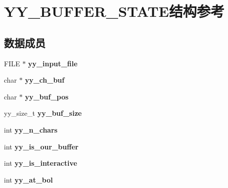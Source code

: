 \hypertarget{structyy__buffer__state}{
\section{YY\_\-BUFFER\_\-STATE结构参考}
\label{structyy__buffer__state}
}
\subsection*{数据成员}
\begin{DoxyCompactItemize}
\item 
\hypertarget{structyy__buffer__state_afb2a40bf9a1b84be81d8e8c0bbcbee21}{
FILE $\ast$ {\bfseries yy\_\-input\_\-file}}
\label{structyy__buffer__state_afb2a40bf9a1b84be81d8e8c0bbcbee21}

\item 
\hypertarget{structyy__buffer__state_af61a9e79f8fc1edb3ae8a2fa2952ce22}{
char $\ast$ {\bfseries yy\_\-ch\_\-buf}}
\label{structyy__buffer__state_af61a9e79f8fc1edb3ae8a2fa2952ce22}

\item 
\hypertarget{structyy__buffer__state_ae8850ab3d90f9339c392020e7d83c4c7}{
char $\ast$ {\bfseries yy\_\-buf\_\-pos}}
\label{structyy__buffer__state_ae8850ab3d90f9339c392020e7d83c4c7}

\item 
\hypertarget{structyy__buffer__state_a98a79041ff2a95eaa8a5c6d1e1562306}{
yy\_\-size\_\-t {\bfseries yy\_\-buf\_\-size}}
\label{structyy__buffer__state_a98a79041ff2a95eaa8a5c6d1e1562306}

\item 
\hypertarget{structyy__buffer__state_aa86c122f2050dbfd365fcf547e6fc1c3}{
int {\bfseries yy\_\-n\_\-chars}}
\label{structyy__buffer__state_aa86c122f2050dbfd365fcf547e6fc1c3}

\item 
\hypertarget{structyy__buffer__state_a1e64bbdc1343d886bee3af97e19644bc}{
int {\bfseries yy\_\-is\_\-our\_\-buffer}}
\label{structyy__buffer__state_a1e64bbdc1343d886bee3af97e19644bc}

\item 
\hypertarget{structyy__buffer__state_a2a823a361fbbe1af51a957d0d0cbf4e2}{
int {\bfseries yy\_\-is\_\-interactive}}
\label{structyy__buffer__state_a2a823a361fbbe1af51a957d0d0cbf4e2}

\item 
\hypertarget{structyy__buffer__state_a8e60af6806593faf52d1cc01148af6e3}{
int {\bfseries yy\_\-at\_\-bol}}
\label{structyy__buffer__state_a8e60af6806593faf52d1cc01148af6e3}


\end{DoxyCompactItemize}
